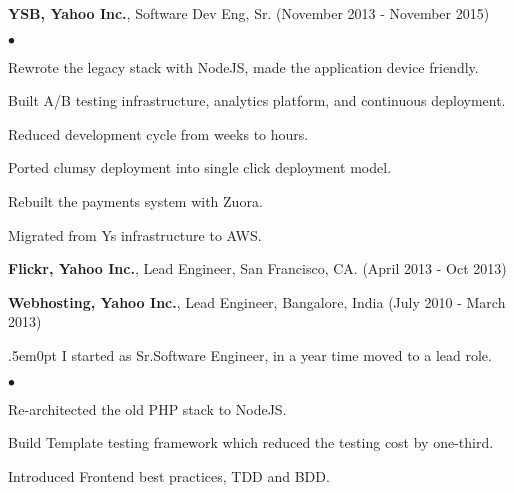 \documentclass[margin, line, 10pt]{res}
\newenvironment{list2}{
  \begin{list}{$\bullet$}{%
      \setlength{\itemsep}{0in}
      \setlength{\parsep}{0in} \setlength{\parskip}{0in}
      \setlength{\topsep}{0in} \setlength{\partopsep}{0in}
      \setlength{\leftmargin}{0.2in}}}{\end{list}}
\begin{document}
\begin{resume}
\vspace{.05cm}

{\Large {\bf YSB, Yahoo Inc.}}, Software Dev Eng, Sr. (November 2013 - November 2015)\\
\vspace{-.1cm}
\begin{list2}
\vspace{.1cm}
\item Rewrote the legacy stack with NodeJS, made the application device friendly.
\item Built A/B testing infrastructure, analytics platform, and continuous deployment.
\item Reduced development cycle from weeks to hours.
\item Ported clumsy deployment into single click deployment model.
\item Rebuilt the payments system with Zuora.
\item Migrated from Y\textsc{}s infrastructure to AWS.
\end{list2}
\vspace{.05cm}

{\Large {\bf Flickr, Yahoo Inc.}}, Lead Engineer, San Francisco, CA.  \hfill (April 2013 - Oct 2013)\\
\vspace{-.1cm}

{\Large {\bf Webhosting, Yahoo Inc.}}, Lead Engineer, Bangalore, India  \hfill (July 2010 - March 2013)\\
\vspace{-.1cm}
\begin{adjustwidth}{.5em}{0pt}
I started as Sr.Software Engineer, in a year time moved to a lead role.\\
\end{adjustwidth}
\begin{list2}
\vspace{-.2cm}
\item Re-architected the old PHP stack to NodeJS.\\
\vspace{-.3cm}
\item Build Template testing framework which reduced the testing cost by one-third.\\
\vspace{-.3cm}
\item Introduced Frontend best practices, TDD and BDD.\\
\end{list2}
\vspace{.05cm}



\end{resume}
\end{document}
